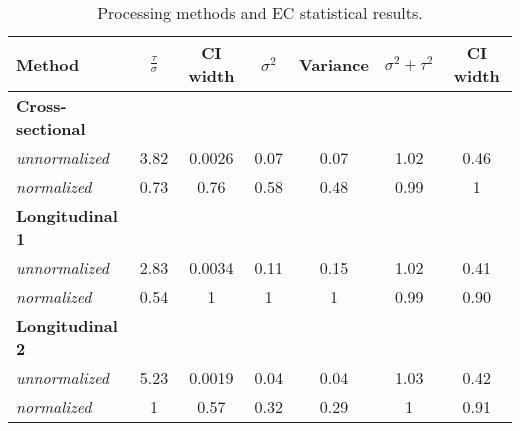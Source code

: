 
\begin{table}[h!]
\centering
\caption{Processing methods and EC statistical results.}
\begin{tabular*}{0.77\textwidth}{@{\extracolsep{\fill}} lcc|cc|cc}
\hline
Method & $\frac{\tau}{\sigma}$ & CI width\footnotemark[1] & $\sigma^2$ & Variance\footnotemark[2] & $\sigma^2 + \tau^2$ & CI width\footnotemark[3] \\
\hline
\bf{Cross-sectional} &&&&&& \\
\quad \emph{unnormalized} & 3.82 & 0.0026  & 0.07 & 0.07 & 1.02 & \cellcolor{red} 0.46  \\
\quad \emph{normalized}   & 0.73 & 0.76  & 0.58 & 0.48 & 0.99 & \cellcolor{red} 1 \\
\bf{Longitudinal 1} &&&&&& \\
\quad \emph{unnormalized}  & \cellcolor{red} 2.83 & \cellcolor{red} 0.0034 & \cellcolor{red} 0.11 &\cellcolor{red} 0.15 & \cellcolor{green} 1.02 & \cellcolor{green} 0.41 \\
\quad \emph{normalized}   & \cellcolor{red} 0.54 & \cellcolor{red} 1 &\cellcolor{red} 1 &\cellcolor{red} 1 & \cellcolor{green} 0.99 & \cellcolor{green} 0.90 \\
\bf{Longitudinal 2} &&&&&& \\
 \quad \emph{unnormalized}  & \cellcolor{green} 5.23 & \cellcolor{green} 0.0019 & \cellcolor{green} 0.04 & \cellcolor{green} 0.04 & \cellcolor{red} 1.03 & 0.42 \\
 \quad \emph{normalized}   & \cellcolor{green} 1 & \cellcolor{green} 0.57 & \cellcolor{green} 0.32 & \cellcolor{green} 0.29 & \cellcolor{red} 1 & 0.91 \\
\hline
\end{tabular*}
\label{table:res_tab}
\end{table}
